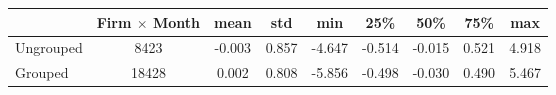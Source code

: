 \begin{tabular}{lcccccccc}
\toprule
{} &  Firm $\times$ Month &   mean &    std &    min &    25\% &    50\% &    75\% &    max \\
\midrule
Ungrouped &                   8423 & -0.003 &  0.857 & -4.647 & -0.514 & -0.015 &  0.521 &  4.918 \\
Grouped   &                  18428 &  0.002 &  0.808 & -5.856 & -0.498 & -0.030 &  0.490 &  5.467 \\
\bottomrule
\end{tabular}
